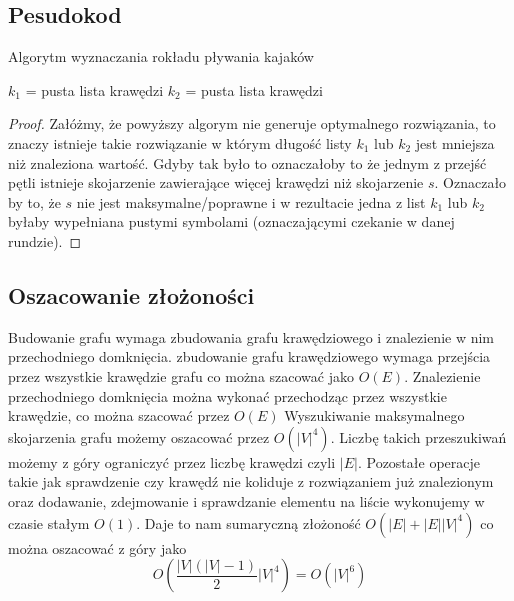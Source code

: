 \documentclass{llncs}
\begin{document}
\subsection{Pesudokod}
\begin{algorithm}[H]
 \caption{Algorytm wyznaczania rokładu pływania kajaków}
 $k_1$ = pusta lista krawędzi\;
 $k_2$ = pusta lista krawędzi\;
\end{algorithm}

\begin{proof}
Załóżmy, że powyższy algorym nie generuje optymalnego rozwiązania, to znaczy istnieje
takie rozwiązanie w którym długość listy $k_1$ lub $k_2$ jest mniejsza niż znaleziona wartość.
Gdyby tak było to oznaczałoby to że jednym z przejść pętli istnieje
skojarzenie zawierające więcej krawędzi niż skojarzenie $s$. 
Oznaczało by to, że $s$ nie jest maksymalne/poprawne i w rezultacie jedna z list $k_1$ lub $k_2$ byłaby wypełniana pustymi
symbolami (oznaczającymi czekanie w danej rundzie).
\end{proof}

\subsection{Oszacowanie złożoności}
Budowanie grafu wymaga zbudowania grafu krawędziowego i znalezienie w nim przechodniego domknięcia. zbudowanie grafu krawędziowego
wymaga przejścia przez wszystkie krawędzie grafu co można 
szacować jako $O(E)$. Znalezienie przechodniego domknięcia
można wykonać przechodząc przez wszystkie krawędzie, 
co można szacować przez $O(E)$
Wyszukiwanie maksymalnego skojarzenia grafu możemy oszacować przez $O(|V|^4)$\cite{wiki-blossom}.
Liczbę takich przeszukiwań możemy z góry ograniczyć przez liczbę krawędzi czyli $|E|$. 
Pozostałe operacje takie jak sprawdzenie czy krawędź nie koliduje z rozwiązaniem już znalezionym
oraz dodawanie, zdejmowanie i sprawdzanie elementu na liście wykonujemy w czasie stałym $O(1)$.
Daje to nam sumaryczną złożoność $O(|E|+|E||V|^4)$ co można oszacować z góry jako 
\begin{equation}
O(\frac{|V|(|V|-1)}{2} |V|^4) = O(|V|^6)
\end{equation}
\end{document}
